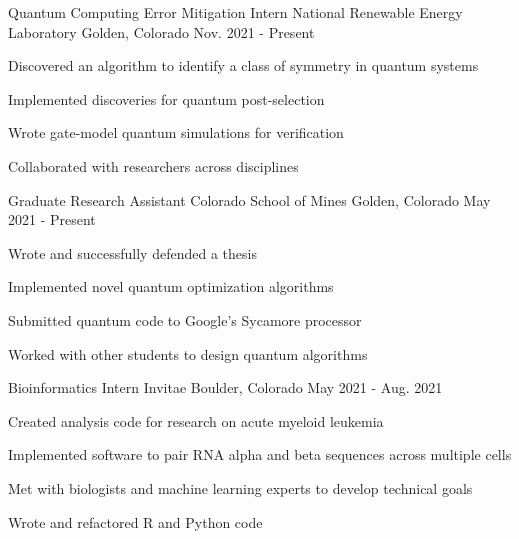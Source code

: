 

\begin{cventries}

  \cventry
    {Quantum Computing Error Mitigation Intern}
    {National Renewable Energy Laboratory}
    {Golden, Colorado}
    {Nov. 2021 - Present}
    {
      \begin{cvitems}
        \item {Discovered an algorithm to identify a class of symmetry in quantum systems}
        \item {Implemented discoveries for quantum post-selection}
        \item {Wrote gate-model quantum simulations for verification}
        \item {Collaborated with researchers across disciplines}
      \end{cvitems}
    }

  \cventry
    {Graduate Research Assistant}
    {Colorado School of Mines}
    {Golden, Colorado}
    {May 2021 - Present}
    {
      \begin{cvitems}
        \item {Wrote and successfully defended a thesis}
        \item {Implemented novel quantum optimization algorithms}
        \item {Submitted quantum code to Google's Sycamore processor}
        \item {Worked with other students to design quantum algorithms}
      \end{cvitems}
    }

  \cventry
    {Bioinformatics Intern}
    {Invitae}
    {Boulder, Colorado}
    {May 2021 - Aug. 2021}
    {
      \begin{cvitems}
        \item {Created analysis code for research on acute myeloid leukemia}
        \item {Implemented software to pair RNA alpha and beta sequences across multiple cells}
        \item {Met with biologists and machine learning experts to develop technical goals}
        \item {Wrote and refactored R and Python code}
      \end{cvitems}
    }
    

\end{cventries}
